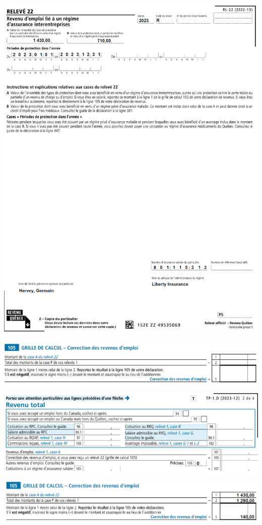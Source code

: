 \begin{sousQuestion}
\begin{center}
		\includegraphics[width=.96\textwidth]{exercice/2-6/Q1/b-RL22.png}
	\end{center}
	
	\noindent
	\includegraphics[width=\textwidth]{exercice/2-6/Q1/b-105.png}
	
	\noindent
	\includegraphics[width=\textwidth]{exercice/2-6/Q1/b-TP1.png}
\end{sousQuestion}
\noindent
\includegraphics[width=\textwidth]{exercice/2-6/Q1/b-105-reponse.png}

